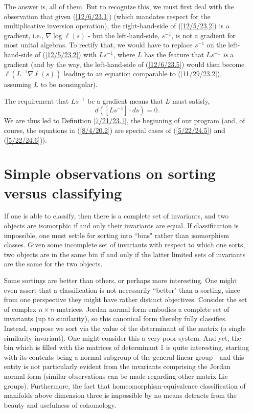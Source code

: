 \documentclass{amsart}
\numberwithin{equation}{section}
\theoremstyle{definition}
\numberwithin{theorem}{section}
\begin{document}
{The answer is, all of them.  But to recognize this, we must first deal with the observation that given (\ref{12/6/23.1}) (which mandates respect for the multiplicative inversion operation), the right-hand-side of (\ref{12/5/23.2}) is a gradient, i.e., $\nabla\log \ell(s)$ - but the left-hand-side, $s^{-1}$, is not a gradient for most unital algebras.  
To rectify that, we would have to replace $s^{-1}$ on the left-hand-side of (\ref{12/5/23.2}) with $Ls^{-1}$, where $L$ has the feature that $Ls^{-1}$ {\it is} a gradient (and by the way, the left-hand-side of (\ref{12/6/23.5}) would then become $\ell(L^{-1}\nabla\ell(s))$ leading to an equation comparable to  (\ref{11/29/23.2}), assuming $L$ to be nonsingular).   


The requirement that $Ls^{-1}$ be a gradient means that $L$ must satisfy, \[ d([Ls^{-1}]\cdot ds) = 0.\]  We are thus led to Definition \ref{7/21/23.1}, the beginning of our program (and, of course, the equations in (\ref{8/4/20.2}) are special cases of (\ref{5/22/24.5}) and (\ref{5/22/24.6})).

\vspace{.5cm}

\section{Simple observations on sorting versus classifying} 

If one is able to classify, then there is a complete set of invariants, and two objects are isomorphic if and only their invariants are equal.  If classification is impossible, one must settle for sorting into ``bins" rather than isomorphism classes.  Given some incomplete set of invariants with respect to which one sorts, two objects are in the same bin if and only if the latter limited sets of invariants are the same for the two objects.  

Some sortings are better than others, or perhaps more interesting.  One might even assert that a classification is not necessarily ``better" than a sorting, since from one perspective they might have rather distinct objectives.  Consider the set of complex $n\times n$-matrices.  Jordan normal form embodies a complete set of \mbox{invariants} (up to similarity), so this canonical form thereby fully classifies.  Instead, suppose we sort via the value of the determinant of the matrix (a single similarity invariant).  One might consider this a very poor system.  And yet, the bin which is filled with the matrices of determinant 1 is quite interesting, starting with its contents being a normal subgroup of the general linear group - and this entity is not particularly evident from the invariants comprising the Jordan normal form (similar observations can be made regarding other matrix Lie groups). Furthermore, the fact that homeomorphism-equivalence classification of manifolds above dimension three is impossible by no means detracts from the beauty and usefulness of cohomology.  


}
\end{document}
